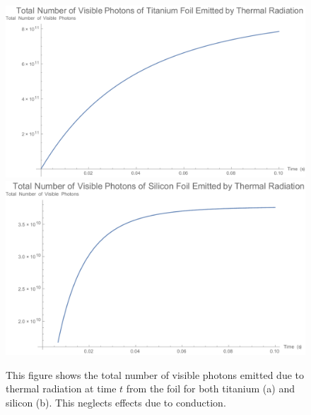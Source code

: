 \documentclass[12pt]{article}
\begin{document}
\begin{figure}
\begin{center}
\includegraphics[scale=0.5]{figures/PhotonsTotalTi.PDF}
\includegraphics[scale=0.5]{figures/PhotonsTotalSi.PDF}
\caption{This figure shows the total number of visible photons emitted due to thermal radiation at time $t$ from the foil for both titanium (a) and silicon (b). This neglects effects due to conduction.}
\end{center}
\end{figure}
\end{document}

